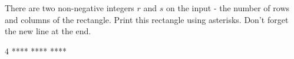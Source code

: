 




There are two non-negative integers $r$ and $s$ on the input - the number of rows and columns of the rectangle. Print this rectangle using asterisks. Don't forget the new line at the end.

 4
\vystup
****
****
****
\koniec

